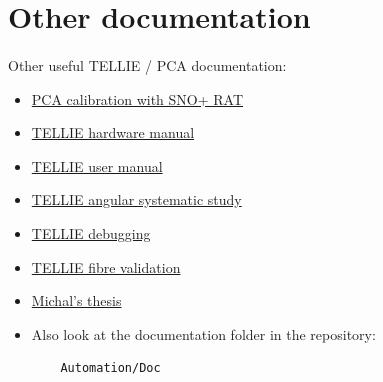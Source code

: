\documentclass[12pt]{article}
\begin{document}
\section{Other documentation}
\paragraph{}
Other useful TELLIE / PCA documentation:
\begin{itemize}
	\item \href{https://www.snolab.ca/snoplus/private/DocDB/cgi/ShowDocument?docid=1987}{PCA calibration with SNO+ RAT}
	\item \href{https://www.snolab.ca/snoplus/private/DocDB/cgi/ShowDocument?docid=4486&version=1}{TELLIE hardware manual}
	\item \href{http://users.sussex.ac.uk/~mr514/TELLIE_Usersmanual.pdf}{TELLIE user manual}
	\item \href{http://users.sussex.ac.uk/~mr514/TELLIE_angular_systematic.pdf}{TELLIE angular systematic study}
	\item \href{http://users.sussex.ac.uk/~mr514/TELLIE_debugging_manual.pdf}{TELLIE debugging}
	\item \href{http://users.sussex.ac.uk/~mr514/TELLIE_fibre_validation.pdf}{TELLIE fibre validation}
	\item \href{https://www.snolab.ca/snoplus/private/DocDB/cgi/ShowDocument?docid=7192}{Michal's thesis}
	\item Also look at the documentation folder in the repository:
	\begin{lstlisting}
	Automation/Doc
	\end{lstlisting}
\end{itemize}
\end{document}
